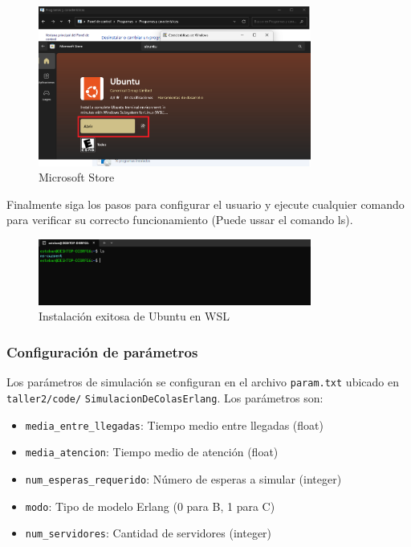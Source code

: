 \documentclass{article}
\begin{document}
\begin{enumerate}
    \begin{figure}[H]
    \centering
    \includegraphics[width=0.8\textwidth]{images/manualUsuarioErlangBC_8.png}
    \caption{Microsoft Store}
    \label{fig:version}
\end{figure}

Finalmente siga los pasos para configurar el usuario y ejecute cualquier comando para verificar su correcto funcionamiento (Puede ussar el comando ls).

\begin{figure}[H]
    \centering
    \includegraphics[width=0.8\textwidth]{images/manualUsuarioErlangBC_9.png}
    \caption{Instalación exitosa de Ubuntu en WSL}
    \label{fig:version}
\end{figure}

\end{enumerate}

\subsubsection{Configuración de parámetros}
Los parámetros de simulación se configuran en el archivo 
\texttt{param.txt} ubicado en \texttt{taller2/code/}
\texttt{SimulacionDeColasErlang}. Los parámetros son:

\begin{itemize}
    \item \texttt{media\_entre\_llegadas}: Tiempo medio entre llegadas (float)
    \item \texttt{media\_atencion}: Tiempo medio de atención (float)
    \item \texttt{num\_esperas\_requerido}: Número de esperas a simular (integer)
    \item \texttt{modo}: Tipo de modelo Erlang (0 para B, 1 para C)
    \item \texttt{num\_servidores}: Cantidad de servidores (integer)
\end{itemize}
\end{document}
